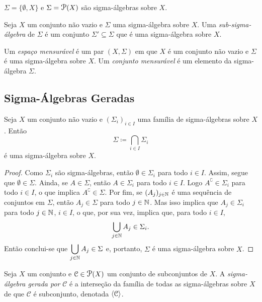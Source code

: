 \begin{ex}
	$\Sigma = \{\emptyset,X\}$ e $\Sigma = \p(X)$ são sigma-álgebras sobre $X$.
\end{ex}

\begin{defi}
Seja $X$ um conjunto não vazio e $\Sigma$ uma sigma-álgebra sobre $X$. Uma \emph{sub-sigma-álgebra} de $\Sigma$ é um conjunto $\Sigma' \subseteq \Sigma$ que é uma sigma-álgebra sobre $X$.
\end{defi}

\begin{defi}
	Um \emph{espaço mensurável} é um par $(X,\Sigma)$ em que $X$ é um conjunto não vazio e $\Sigma$ é uma sigma-álgebra sobre $X$. Um \emph{conjunto mensurável} é um elemento da sigma-álgebra $\Sigma$.
\end{defi}

\subsection{Sigma-Álgebras Geradas}

\begin{prop}
Seja $X$ um conjunto não vazio e $(\Sigma_i)_{i \in I}$ uma família de sigma-álgebras sobre $X$. Então
	\begin{equation*}
	\Sigma \coloneqq \bigcap_{i \in I} \Sigma_i
	\end{equation*}
é uma sigma-álgebra sobre $X$.
\end{prop}
\begin{proof}
	Como $\Sigma_i$ são sigma-álgebras, então $\emptyset \in \Sigma_i$ para todo $i \in I$. Assim, segue que $\emptyset \in \Sigma$. Ainda, se $A \in \Sigma$, então $A \in \Sigma_i$ para todo $i \in I$. Logo $A^\complement \in \Sigma_i$ para todo $i \in I$, o que implica $A^\complement \in \Sigma$. Por fim, se $(A_j)_{j \in \mathbb{N}}$ é uma sequência de conjuntos em $\Sigma$, então $A_j \in \Sigma$ para todo $j \in \mathbb{N}$. Mas isso implica que $A_j \in \Sigma_i$ para todo $j \in \mathbb{N}$, $i \in I$, o que, por sua vez, implica que, para todo $i \in I$,
	\begin{equation*}
	\bigcup_{j \in \mathbb{N}} A_j \in \Sigma_i.
	\end{equation*}
Então conclui-se que $\displaystyle\bigcup_{j \in \mathbb{N}} A_j \in \Sigma$ e, portanto, $\Sigma$ é uma sigma-álgebra sobre $X$.
\end{proof}

\begin{defi}
Seja $X$ um conjunto e $\mathcal C \in \p(X)$ um conjunto de subconjuntos de $X$. A \emph{sigma-álgebra gerada por} $\mathcal C$ é a interseção da família de todas as sigma-álgebras sobre $X$ de que $\mathcal C$ é subconjunto, denotada $\left\langle \mathcal C \right\rangle$.
\end{defi}
	
